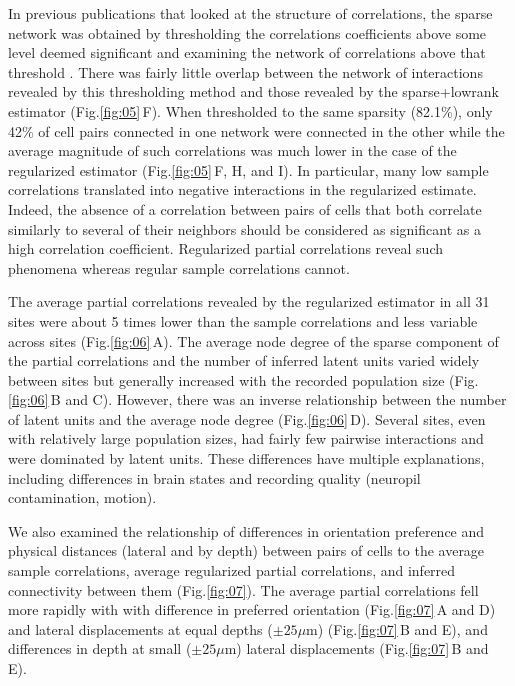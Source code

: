 \documentclass[10pt]{article}
\begin{document}
In previous publications that looked at the structure of correlations, the sparse network was obtained by thresholding the correlations coefficients  above some level deemed significant and examining the network of correlations above that threshold \cite{Golshani:2009,Malmersjo:2013}. There was fairly little overlap between the network of interactions revealed by this thresholding method and those revealed by the sparse+lowrank estimator (Fig.\;\ref{fig:05}\,F). When thresholded to the same sparsity (82.1\%), only 42\% of cell pairs connected in one network were connected in the other while the average magnitude of such correlations was much lower in the case of the regularized estimator (Fig.\;\ref{fig:05}\,F, H, and I). In particular, many low sample correlations translated into negative interactions in the regularized estimate. Indeed, the absence of a correlation between pairs of cells that both correlate similarly to several of their neighbors should be considered as significant as a high correlation coefficient. Regularized partial correlations reveal such phenomena whereas regular sample correlations cannot.

The average partial correlations  revealed by the regularized estimator in all 31 sites were about 5 times lower than the sample correlations and  less variable across sites (Fig.\;\ref{fig:06}\,A). The average node degree of the sparse component of the partial correlations and the number of  inferred latent units varied widely between sites but generally increased with the recorded population size (Fig.\;\ref{fig:06}\,B and C). However, there was an inverse relationship between the number of latent units and the average node degree (Fig.\;\ref{fig:06}\,D). Several sites, even with relatively large population sizes, had fairly few pairwise interactions and were dominated by latent units.  These differences have multiple explanations, including differences in brain states and recording quality (neuropil contamination, motion). 

We also examined the relationship of differences in orientation preference and physical distances (lateral and by depth) between pairs of cells  to the average sample correlations, average regularized partial correlations, and inferred connectivity between them (Fig.\;\ref{fig:07}). The average partial correlations fell more rapidly with with difference in preferred orientation (Fig.\;\ref{fig:07}\,A and D) and lateral displacements at equal depths ($\pm 25\mu$m) (Fig.\;\ref{fig:07}\,B and E), and differences in depth at small ($\pm 25\mu$m) lateral displacements (Fig.\;\ref{fig:07}\,B and E).
\end{document}
